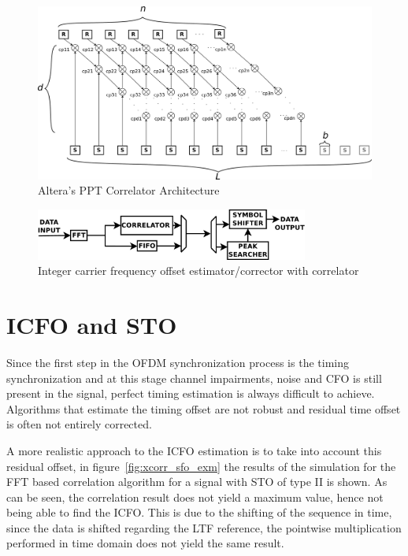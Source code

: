  \begin{figure}[!hbt]
  \centering
    \includegraphics[width=1\textwidth]
      {./figures/ppt_correlator_altera.eps}
  \caption{Altera's PPT Correlator Architecture}
  \label{fig:ppt_correlator}
\end{figure}
 
 
 
 
 
\begin{figure}[!hbt]
  \centering
    \includegraphics[width=0.8\textwidth]
      {./figures/int_cfo_arch_2}
  \caption{Integer carrier frequency offset estimator/corrector with correlator}
  \label{fig:arq_cfo_2}
\end{figure}



\section{ICFO and STO }

Since the first step in the OFDM synchronization process is the timing synchronization and at this stage channel impairments, noise and CFO is still present in the signal, perfect timing estimation is always difficult to achieve. Algorithms that estimate the timing offset are not robust and residual time offset is often not entirely corrected.  


A more realistic approach to the ICFO estimation is to take into account this residual offset, in figure~\ref{fig:xcorr_sfo_exm} the results of the simulation for the FFT based correlation algorithm for a signal with STO of type II is shown. As can be seen, the correlation result does not yield a maximum value, hence not being able to find the ICFO. This is due to the shifting of the sequence in time, since the data is shifted regarding the LTF reference, the pointwise multiplication performed in time domain does not yield the same result. %


